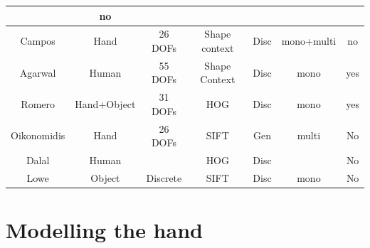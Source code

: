 \documentclass[a4paper,11pt]{kth-mag}
\begin{document}
\begin{table}[!ht]
{\begin{tabular}{|c|c|c|c|c|c|c|}
                                    & no
        \\
        \hline
        Campos \cite{regressionBased}     
                                    & Hand
                                    & 26 DOFs 
                                    & Shape context 
                                    & Disc%
                                    & mono+multi 
                                    & no
        \\
        \hline
        Agarwal \cite{recovering3D}     
                                    & Human
                                    & 55 DOFs 
                                    & Shape Context 
                                    & Disc%
                                    & mono
                                    & yes
        \\
        \hline
        Romero \cite{monocular}     
                                    & Hand+Object
                                    & 31 DOFs 
                                    & HOG %
                                    & Disc%
                                    & mono
                                    & yes
        \\
        \hline
        Oikonomidis \cite{fullDOF}
                                    & Hand
                                    & 26 DOFs 
                                    & SIFT
                                    & Gen%
                                    & multi 
                                    & No
        \\
        \hline
        Dalal \cite{HOG}    & Human 
                                    & %
                                    & HOG
                                    & Disc %
                                    & %
                                    & No
        \\
        \hline
        Lowe \cite{SIFT}            & Object 
                                    & Discrete 
                                    & SIFT
                                    & Disc%
                                    & mono
                                    & No
        \\
        \hline
    \end{tabular}}
\end{table}
\section{Modelling the hand}
\end{document}
